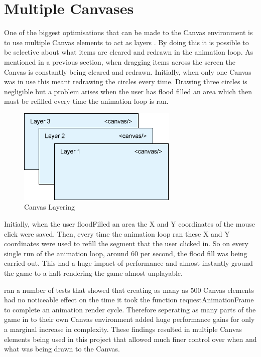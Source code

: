 \documentclass[12pt,a4paper]{report}
\begin{document}
\section{Multiple Canvases}
One of the biggest optimisations that can be made to the Canvas environment is to use multiple Canvas elements to act as layers \citep{IBMCanvasLayers}. By doing this it is possible to be selective about what items are cleared and redrawn in the animation loop. As mentioned in a previous section, when dragging items across the screen the Canvas is constantly being cleared and redrawn. Initially, when only one Canvas was in use this meant redrawing the circles every time. Drawing three circles is negligible but a problem arises when the user has flood filled an area which then must be refilled every time the animation loop is ran.

\begin{figure}[h]
\centering
    \includegraphics[scale=0.5]{canvasLayers}
    \caption{Canvas Layering}
    \label{fig:canvasLayering}
\end{figure}


Initially, when the user floodFilled an area the X and Y coordinates of the mouse click were saved. Then, every time the animation loop ran these X and Y coordinates were used to refill the segment that the user clicked in. So on every single run of the animation loop, around 60 per second, the flood fill was being carried out. This had a huge impact of performance and almost instantly ground the game to a halt rendering the game almost unplayable.

\cite{StackCanvasTest} ran a number of tests that showed that creating as many as 500 Canvas elements had no noticeable effect on the time it took the function requestAnimationFrame to complete an animation render cycle. Therefore seperating as many parts of the game in to their own Canvas environment added huge performance gains for only a marginal increase in complexity. These findings resulted in multiple Canvas elements being used in this project that allowed much finer control over when and what was being drawn to the Canvas.
\end{document}
